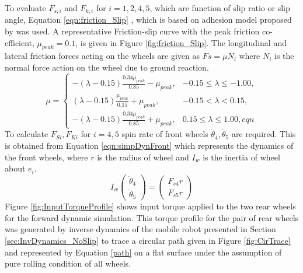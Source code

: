 {To evaluate $F_{s,i} $ and $F_{k,i}$ for $i=1,2,4,5$,   which are function of  slip ratio or slip angle,  Equation \ref{eqn:friction_Slip}  \cite{balakrishna1995modeling}, which is based on adhesion model proposed by \cite{dugoff1970analysis} was used.  A representative Friction-slip curve with the peak friction co-efficient, $\mu_{peak}=0.1$, is given in  Figure \ref{fig:friction_Slip}. The longitudinal and lateral friction forces acting on the wheels are given as $Fs=\mu N_i$ where $N_i$ is the normal force action on the wheel due to ground reaction.  
\begin{equation}
\label{eqn:friction_Slip}
\mu =
\begin{cases}
-(\lambda-0.15)\frac{0.34\mu_{peak}}{0.85}-\mu_{peak}, & -0.15\le\lambda \le -1.00,\\
(\lambda-0.15)\frac{\mu_{peak}}{0.15}+\mu_{peak}, & -0.15<\lambda<0.15,
\\
-(\lambda-0.15)\frac{0.34\mu_{peak}}{0.85}+\mu_{peak}, & 0.15\le\lambda \le 1.00,
eqn
\end{cases}
\end{equation}
To calculate $F_{Si},F_{Ki}$ for $ i=4,5$ spin rate of front wheels $\dot\theta_4,\dot\theta_5$ are required. This is obtained from Equation \ref{eqn:simpDynFront} which represents the dynamics  of the front wheels, where $r$ is the radius of wheel and $I_w$ is the inertia of wheel about $e_i$.
\begin{equation}
\label{eqn:simpDynFront}
I_w\begin{pmatrix}
 \ddot\theta_4\\
 \ddot\theta_5
\end{pmatrix}
=
\begin{pmatrix}
F_{s4} r\\
F_{s5} r
\end{pmatrix}
\end{equation}
 Figure \ref{fig:InputTorqueProfile} shows input torque applied to the two rear wheels for the forward dynamic simulation. This torque profile for the pair of rear wheels was generated by inverse dynamics  of the mobile robot presented in Section \ref{sec:InvDynamics_NoSlip} to trace a circular path given in Figure \ref{fig:CirTrace} and represented by Equation \ref{path} on a flat surface under the assumption of pure rolling condition of all wheels. 

}
